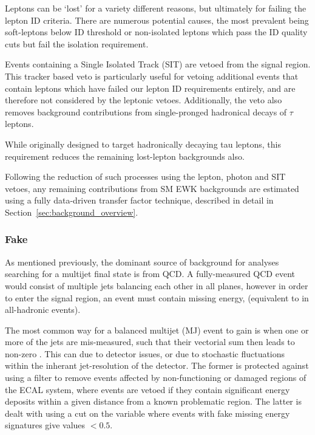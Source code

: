 Leptons can be `lost' for a variety different reasons, but ultimately for failing
the lepton ID criteria. There are numerous potential causes, the 
most prevalent being soft-leptons below ID threshold or non-isolated leptons 
which pass the ID quality cuts but fail the isolation requirement.

Events containing a Single Isolated Track (SIT) are vetoed from the signal 
region. This tracker based veto is particularly useful for vetoing additional events 
that contain leptons which have failed our lepton ID requirements entirely, and 
are therefore not considered by the leptonic vetoes. Additionally, the veto also
removes background contributions from single-pronged hadronical decays of $\tau$
leptons.

While originally designed to target hadronically decaying tau leptons, 
this requirement reduces the remaining lost-lepton backgrounds also.

Following the reduction of such processes using the lepton, photon and SIT vetoes,
any remaining contributions from SM EWK backgrounds are estimated using a 
fully data-driven transfer factor technique, described in detail in
Section~\ref{sec:background_overview}.

\subsubsection{Fake \met}

As mentioned previously, the dominant source of background for analyses 
searching for a multijet final state is from QCD. A fully-measured QCD event 
would consist of multiple jets balancing each other in all planes, however in 
order to enter the signal region, an event must contain missing energy, 
\mht (equivalent to \met in all-hadronic events).

The most common way for a balanced multijet (MJ) event to gain \mht is when one 
or more of the jets are mis-measured, such that their vectorial sum then leads to non-zero
\mht. This can due to detector issues, or due to stochastic fluctuations within
the inherant jet-resolution of the 
detector. The former is protected against using a filter to remove events 
affected by non-functioning or damaged regions of the ECAL system, where 
events are vetoed if they contain significant energy deposits within a given 
distance from a known problematic region. The latter is dealt with using a
cut on the \alphat variable where 
events with fake missing energy signatures give values $<0.5$.

